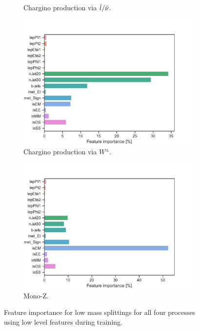 \begin{figure}[H]
\begin{subfigure}[t!]{0.49\textwidth}
        \caption{Chargino production via $\Tilde{l}/\Tilde{\nu}$.}
        \label{fig:}
    \end{subfigure}
    \begin{subfigure}[t!]{0.49\textwidth}
        \includegraphics[width = \textwidth]{Figures/WW/BDT/Low_level/Low/featureImportance.pdf}
        \caption{Chargino production via $W^\pm$.}
        \label{fig:}
    \end{subfigure}
    \begin{subfigure}[t!]{0.49\textwidth}
        \includegraphics[width = \textwidth]{Figures/Mono_Z/ML/BDT/Low_level/Low/featureImportance.pdf}
        \caption{Mono-Z.}
        \label{fig:}
    \end{subfigure}
    \caption{Feature importance for low mass splittings for all four processes using low level features during training.}
    \label{fig:Non}
\end{figure}


